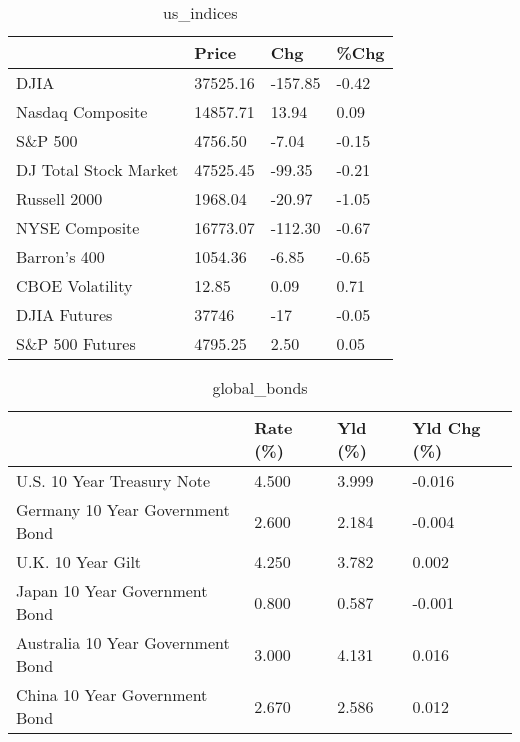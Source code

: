 \documentclass{article}%
\begin{document}
%


\begin{table}[htbp]%
\caption{us\_indices}%
\centering%
\begin{adjustbox}{width=1\textwidth}%
\begin{tabular}{llll}
\toprule
                      &    Price &     Chg &  \%Chg \\
\midrule
                 DJIA & 37525.16 & -157.85 & -0.42 \\
     Nasdaq Composite & 14857.71 &   13.94 &  0.09 \\
              S\&P 500 &  4756.50 &   -7.04 & -0.15 \\
DJ Total Stock Market & 47525.45 &  -99.35 & -0.21 \\
         Russell 2000 &  1968.04 &  -20.97 & -1.05 \\
       NYSE Composite & 16773.07 & -112.30 & -0.67 \\
         Barron's 400 &  1054.36 &   -6.85 & -0.65 \\
      CBOE Volatility &    12.85 &    0.09 &  0.71 \\
         DJIA Futures &    37746 &     -17 & -0.05 \\
      S\&P 500 Futures &  4795.25 &    2.50 &  0.05 \\
\bottomrule
\end{tabular}
%
\end{adjustbox}%
\end{table}

%


\begin{table}[htbp]%
\caption{global\_bonds}%
\centering%
\begin{adjustbox}{width=1\textwidth}%
\begin{tabular}{llll}
\toprule
                                  & Rate (\%) & Yld (\%) & Yld Chg (\%) \\
\midrule
       U.S. 10 Year Treasury Note &    4.500 &   3.999 &      -0.016 \\
  Germany 10 Year Government Bond &    2.600 &   2.184 &      -0.004 \\
                U.K. 10 Year Gilt &    4.250 &   3.782 &       0.002 \\
    Japan 10 Year Government Bond &    0.800 &   0.587 &      -0.001 \\
Australia 10 Year Government Bond &    3.000 &   4.131 &       0.016 \\
    China 10 Year Government Bond &    2.670 &   2.586 &       0.012 \\
\bottomrule
\end{tabular}
%
\end{adjustbox}%
\end{table}
\end{document}

